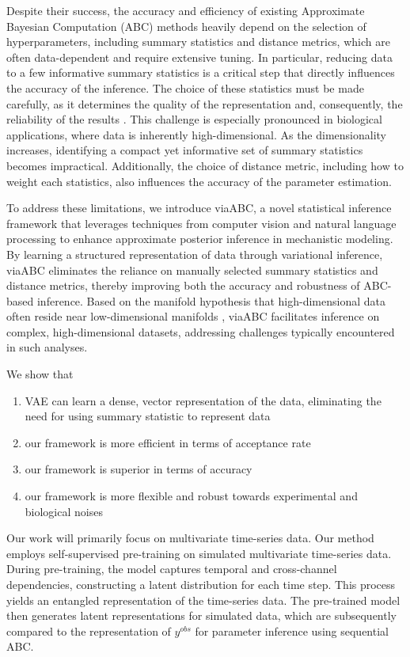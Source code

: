 \documentclass[12pt]{article} %
\begin{document}
Despite their success, the accuracy and efficiency of existing Approximate Bayesian Computation (ABC) methods heavily depend on the selection of hyperparameters, including summary statistics and distance metrics, which are often data-dependent and require extensive tuning. In particular, reducing data to a few informative summary statistics is a critical step that directly influences the accuracy of the inference. The choice of these statistics must be made carefully, as it determines the quality of the representation and, consequently, the reliability of the results \citep{aakesson2021convolutional}. This challenge is especially pronounced in biological applications, where data is inherently high-dimensional. As the dimensionality increases, identifying a compact yet informative set of summary statistics becomes impractical. Additionally, the choice of distance metric, including how to weight each statistics, also influences the accuracy of the parameter estimation.

To address these limitations, we introduce viaABC, a novel statistical inference framework that leverages techniques from computer vision and natural language processing to enhance approximate posterior inference in mechanistic modeling. By learning a structured representation of data through variational inference, viaABC eliminates the reliance on manually selected summary statistics and distance metrics, thereby improving both the accuracy and robustness of ABC-based inference. Based on the manifold hypothesis that high-dimensional data often reside near low-dimensional manifolds \citep{fefferman2016testing}, viaABC facilitates inference on complex, high-dimensional datasets, addressing challenges typically encountered in such analyses. 

\newpage

We show that
\begin{enumerate}
\item VAE can learn a dense, vector representation of the data, eliminating the need for using summary statistic to represent data
\item our framework is more efficient in terms of acceptance rate
\item our framework is superior in terms of accuracy
\item our framework is more flexible and robust towards experimental and biological noises
\end{enumerate}

Our work will primarily focus on multivariate time-series data. Our method employs self-supervised pre-training on simulated multivariate time-series data. During pre-training, the model captures temporal and cross-channel dependencies, constructing a latent distribution for each time step. This process yields an entangled representation of the time-series data. The pre-trained model then generates latent representations for simulated data, which are subsequently compared to the representation of $y^{obs}$ for parameter inference using sequential ABC.
\end{document}
